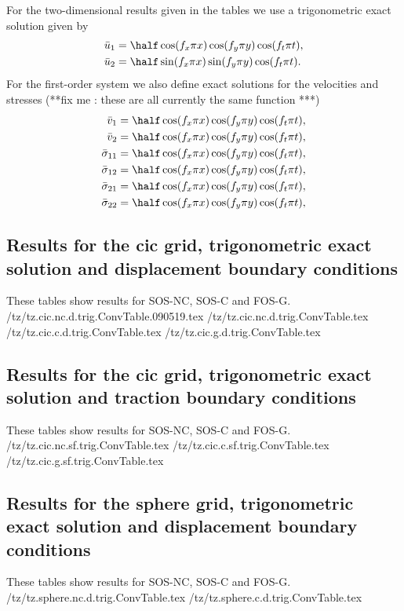 For the two-dimensional results given in the tables we use a trigonometric exact solution given by
\begin{align}
\bar u_1 &=\half \cos(f_x \pi x) \cos(f_y \pi y ) \cos(f_t \pi t),  \\
\bar u_2 &=\half \sin(f_x \pi x) \sin(f_y \pi y ) \cos(f_t \pi t).  \\
\end{align}
For the first-order system we also define exact solutions for the 
velocities and stresses (**fix me : these are all currently the same function ***)
\begin{align}
\bar v_1 &=\half \cos(f_x \pi x) \cos(f_y \pi y ) \cos(f_t \pi t),  \\
\bar v_2 &=\half \cos(f_x \pi x) \cos(f_y \pi y ) \cos(f_t \pi t),  \\
\bar \sigma_{11} &=\half \cos(f_x \pi x) \cos(f_y \pi y ) \cos(f_t \pi t),  \\
\bar \sigma_{12} &=\half \cos(f_x \pi x) \cos(f_y \pi y ) \cos(f_t \pi t),  \\
\bar \sigma_{21} &=\half \cos(f_x \pi x) \cos(f_y \pi y ) \cos(f_t \pi t),  \\
\bar \sigma_{22} &=\half \cos(f_x \pi x) \cos(f_y \pi y ) \cos(f_t \pi t),  
\end{align}


\clearpage
\subsection{Results for the cic grid, trigonometric exact solution and displacement boundary conditions}
These tables show results for SOS-NC, SOS-C and FOS-G.
 \smTzDir/tz/tz.cic.nc.d.trig.ConvTable.090519.tex
 \smTzDir/tz/tz.cic.nc.d.trig.ConvTable.tex
 \smTzDir/tz/tz.cic.c.d.trig.ConvTable.tex
 \smTzDir/tz/tz.cic.g.d.trig.ConvTable.tex

\clearpage
\subsection{Results for the cic grid, trigonometric exact solution and traction boundary conditions}
These tables show results for SOS-NC, SOS-C and FOS-G.
 \smTzDir/tz/tz.cic.nc.sf.trig.ConvTable.tex
 \smTzDir/tz/tz.cic.c.sf.trig.ConvTable.tex
 \smTzDir/tz/tz.cic.g.sf.trig.ConvTable.tex


\clearpage
\subsection{Results for the sphere grid, trigonometric exact solution and displacement boundary conditions}
These tables show results for SOS-NC, SOS-C and FOS-G.
 \smTzDir/tz/tz.sphere.nc.d.trig.ConvTable.tex
 \smTzDir/tz/tz.sphere.c.d.trig.ConvTable.tex


